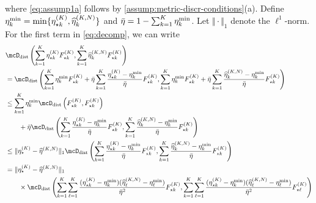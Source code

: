 where \cref{eq:assump1a} follows by  \cref{assump:metric-discr-conditions}(a).
Define $\eta_k^{\min} = \min\{\eta^{(K)}_{\star k}, \widehat{\eta}^{(K, N)}_k\}$ and $\bar{\eta}=1-\sum_{k=1}^{K}\eta_k^{\min}$.
Let $\Vert \cdot \Vert_{1}$ denote the $\ell^1$-norm.
For the first term in \cref{eq:decomp}, we can write
\begin{align}
	 & \distDisc\left(\sum_{k = 1}^{\numcomps} \eta^{(\numcomps)}_{\star k}F^{(\numcomps)}_{\star k}, \sum_{k = 1}^{\numcomps}  \widehat{\eta}_k^{(\numcomps, \numobs)} F^{(\numcomps)}_{\star k} \right)\\
	 & = \distDisc\left(\sum_{k = 1}^{\numcomps} \eta_k^{\min}F^{(\numcomps)}_{\star k} + \bar{\eta}\sum_{k = 1}^{\numcomps}  \frac{\eta^{(\numcomps)}_{\star k}-\eta_k^{\min}}{\bar{\eta}}F^{(\numcomps)}_{\star k}, \sum_{k = 1}^{\numcomps}  \eta_k^{\min}F^{(\numcomps)}_{\star k}+ \bar{\eta}\sum_{k = 1}^{\numcomps}  \frac{\widehat{\eta}_k^{(\numcomps, \numobs)} -  \eta_k^{\min}}{\bar{\eta}}F^{(\numcomps)}_{\star k} \right)  \\
	 & \le \sum_{k = 1}^{\numcomps} \eta_k^{\min}\distDisc\left(F^{(\numcomps)}_{\star k}, F^{(\numcomps)}_{\star k}\right) \\
   &\qquad+ \bar{\eta}\distDisc\left(\sum_{k = 1}^{\numcomps}  \frac{\eta^{(\numcomps)}_{\star k}-\eta_k^{\min}}{\bar{\eta}}F^{(\numcomps)}_{\star k}, \sum_{k = 1}^{\numcomps}  \frac{\widehat{\eta}_k^{(\numcomps, \numobs)} -  \eta_k^{\min}}{\bar{\eta}}F^{(\numcomps)}_{\star k}\right)\label{eq:joint-convexity}\\
	 & \le \Vert \eta^{(\numcomps)}_{\star} - \widehat{\eta}^{(\numcomps,\numobs)} \Vert_{1} \distDisc\left(\sum_{k = 1}^{\numcomps}  \frac{\eta^{(\numcomps)}_{\star k}-\eta_k^{\min}}{\bar{\eta}}F^{(\numcomps)}_{\star k}, \sum_{k = 1}^{\numcomps}  \frac{\widehat{\eta}_k^{(\numcomps, \numobs)} -  \eta_k^{\min}}{\bar{\eta}}F^{(\numcomps)}_{\star k}\right)\label{eq:pi-l1norm-bound-pibar} \\
	 & = \Vert \eta^{(\numcomps)}_{\star} - \widehat{\eta}^{(\numcomps,\numobs)}\Vert_{1} \\
	 & \qquad \times  \distDisc\left( \sum_{k = 1}^{\numcomps} \sum_{\ell = 1}^{\numcomps} \frac{(\eta^{(\numcomps)}_{\star k}-\eta_k^{\min})(\widehat{\eta}_\ell^{(\numcomps, \numobs)} -  \eta_\ell^{\min}) }{\bar{\eta}^2}  F^{(\numcomps)}_{\star k}, \sum_{k = 1}^{\numcomps} \sum_{\ell = 1}^{\numcomps} \frac{(\eta^{(\numcomps)}_{\star k}-\eta_k^{\min})(\widehat{\eta}_\ell^{(\numcomps, \numobs)} -  \eta_\ell^{\min}) }{\bar{\eta}^2} F^{(\numcomps)}_{\star \ell}\right) \\

\end{align}
